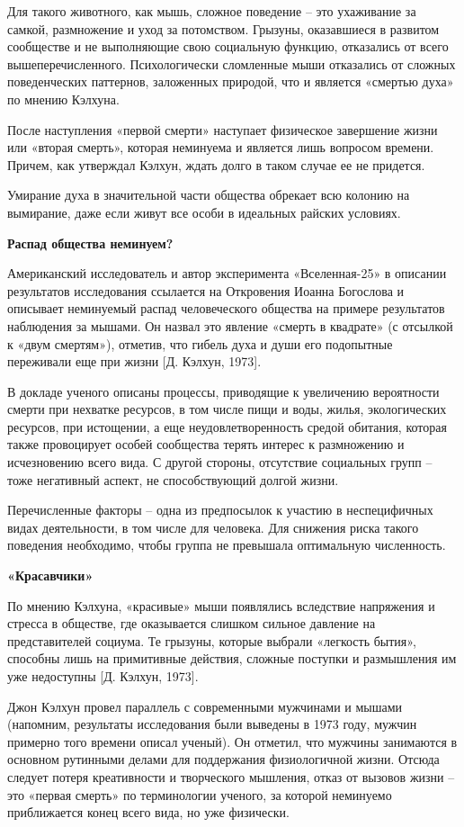 Для такого животного, как мышь, сложное поведение – это ухаживание за самкой, размножение и уход за потомством. Грызуны, оказавшиеся в развитом сообществе и не выполняющие свою социальную функцию, отказались от всего вышеперечисленного. Психологически сломленные мыши отказались от сложных поведенческих паттернов, заложенных природой, что и является «смертью духа» по мнению Кэлхуна.

После наступления «первой смерти» наступает физическое завершение жизни или «вторая смерть», которая неминуема и является лишь вопросом времени. Причем, как утверждал Кэлхун, ждать долго в таком случае ее не придется.

Умирание духа в значительной части общества обрекает всю колонию на вымирание, даже если живут все особи в идеальных райских условиях.

\textbf{Распад общества неминуем?}

Американский исследователь и автор эксперимента «Вселенная-25» в описании результатов исследования ссылается на Откровения Иоанна Богослова и описывает неминуемый распад человеческого общества на примере результатов наблюдения за мышами. Он назвал это явление «смерть в квадрате» (с отсылкой к «двум смертям»), отметив, что гибель духа и души его подопытные переживали еще при жизни [Д.  Кэлхун, 1973].

В докладе ученого описаны процессы, приводящие к увеличению вероятности смерти при нехватке ресурсов, в том числе пищи и воды, жилья, экологических ресурсов, при истощении, а еще неудовлетворенность средой обитания, которая также провоцирует особей сообщества терять интерес к размножению и исчезновению всего вида. С другой стороны, отсутствие социальных групп – тоже негативный аспект, не способствующий долгой жизни.

Перечисленные факторы – одна из предпосылок к участию в неспецифичных видах деятельности, в том числе для человека. Для снижения риска такого поведения необходимо, чтобы группа не превышала оптимальную численность.

\textbf{«Красавчики»}

По мнению Кэлхуна, «красивые» мыши появлялись вследствие напряжения и стресса в обществе, где оказывается слишком сильное давление на представителей социума. Те грызуны, которые выбрали «легкость бытия», способны лишь на примитивные действия, сложные поступки и размышления им уже недоступны [Д.  Кэлхун, 1973].

Джон Кэлхун провел параллель с современными мужчинами и мышами (напомним, результаты исследования были выведены в 1973 году, мужчин примерно того времени описал ученый). Он отметил, что мужчины занимаются в основном рутинными делами для поддержания физиологичной жизни. Отсюда следует потеря креативности и творческого мышления, отказ от вызовов жизни – это «первая смерть» по терминологии ученого, за которой неминуемо приближается конец всего вида, но уже физически.

